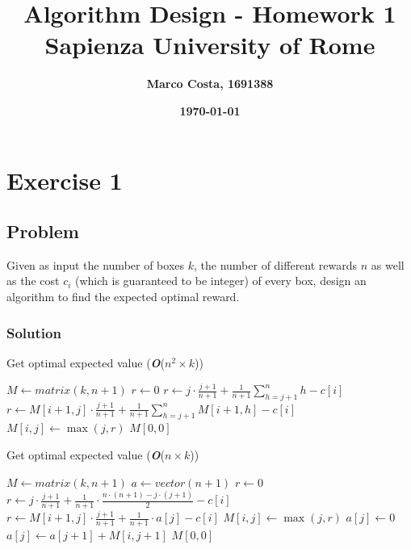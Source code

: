 \documentclass[11pt]{article}
\title{\textbf{Algorithm Design - Homework 1} \\ \bigskip \large \textbf{Sapienza University of Rome}}
\date{\textbf{\today}}
\author{\textbf{Marco Costa, 1691388}}
\begin{document}
\maketitle
\newpage

\section*{Exercise 1}
\subsection*{Problem}
Given as input the number of boxes $k$, the number of different rewards $n$ as well as
the cost $c_i$ (which is guaranteed to be integer) of every box, design an algorithm to find the expected optimal reward.
\subsubsection*{Solution}
\begin{algorithm}[H]
	\centering
	\caption{Get optimal expected value (\textbf{\textit{O}}($n^2 \times k$))}\label{euclid}
	\begin{algorithmic}[1]
		\State $M \gets matrix(k, n+1)$
		\State $r \gets 0$
		\State $r \gets j \cdot \frac{j+1}{n+1} + \frac{1}{n+1}\sum\limits_{h = j + 1}^n{h} - c[i]$
		\Else
		\State $r \gets M[i+1, j] \cdot \frac{j+1}{n+1} + \frac{1}{n+1}\sum\limits_{h = j + 1}^n{M[i+1, h]} - c[i]$
		\EndIf
		\State $M[i, j] \gets \max(j, r)$
		\EndFor		
		\EndFor
		\State \Return $M[0, 0]$
	\end{algorithmic}
\end{algorithm}
\begin{algorithm}[H]
	\centering
	\caption{Get optimal expected value (\textbf{\textit{O}}($n \times k$))}\label{euclid}
	\begin{algorithmic}[1]
		\State $M \gets matrix(k, n+1)$
		\State $a \gets vector(n+1)$
		\State $r \gets 0$
			\State $r \gets j \cdot \frac{j+1}{n+1} + \frac{1}{n+1} \cdot \frac{n \cdot (n+1)-j \cdot (j+1)}{2} - c[i]$
		\Else
			\State $r \gets M[i+1, j] \cdot \frac{j+1}{n+1} + \frac{1}{n+1} \cdot a[j] - c[i]$
		\EndIf
		\State $M[i, j] \gets \max(j, r)$
			\State $a[j] \gets 0$
		\Else
			\State $a[j] \gets a[j+1] + M[i, j+1]$
		\EndIf
		\EndFor		
		\EndFor
		\State \Return $M[0, 0]$
	\end{algorithmic}
\end{algorithm}
\newpage
\end{document}
